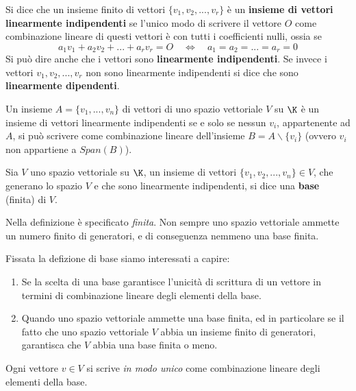 \begin{definition}
	Si dice che un insieme finito di vettori $\{v_1, v_2, ..., v_r\}$ è un
	\textbf{insieme di vettori linearmente indipendenti} se l'unico modo di
	scrivere il vettore $O$ come combinazione lineare di questi vettori è con
	tutti i coefficienti nulli, ossia se
	\[
		a_1 v_1 + a_2 v_2 + ... + a_r v_r = O \quad \Leftrightarrow \quad
		a_1 = a_2 = ... = a_r = 0
	\]
	Si può dire anche che i vettori sono \textbf{linearmente indipendenti}. Se
	invece i vettori $v_1, v_2, ..., v_r$ non sono linearmente indipendenti si
	dice che sono \textbf{linearmente dipendenti}.
\end{definition}

\begin{proposition}
	Un insieme $A = \{v_1, ..., v_n\}$ di vettori di uno spazio vettoriale $V$
	su $\K$ è un insieme di vettori linearmente indipendenti se e solo se nessun
	$v_i$, appartenente ad $A$, si può scrivere come combinazione lineare
	dell'insieme $B = A \backslash \{v_i\}$ (ovvero $v_i$ non appartiene a
	$Span(B)$).
\end{proposition}

\begin{definition}
	Sia $V$ uno spazio vettoriale su $\K$, un insieme di vettori
	$\{v_1, v_2, ..., v_n\} \in V$, che generano lo spazio $V$ e che sono
	linearmente indipendenti, si dice una \textbf{base} (finita) di $V$.
\end{definition}

\begin{observation}
	Nella definizione è specificato \emph{finita}. Non sempre uno spazio
	vettoriale ammette un numero finito di generatori, e di conseguenza nemmeno
	una base finita.
\end{observation}

Fissata la defizione di base siamo interessati a capire:
\begin{enumerate}
	\item Se la scelta di una base garantisce l'unicità di scrittura di un
	      vettore in termini di combinazione lineare degli elementi della base.
	\item Quando uno spazio vettoriale ammette una base finita, ed in
	      particolare se il fatto che uno spazio vettoriale $V$ abbia un insieme
	      finito di generatori, garantisca che $V$ abbia una base finita o meno.
\end{enumerate}

\begin{proposition}
	Ogni vettore $v \in V$ si scrive \emph{in modo unico} come combinazione
	lineare degli elementi della base.
\end{proposition}

